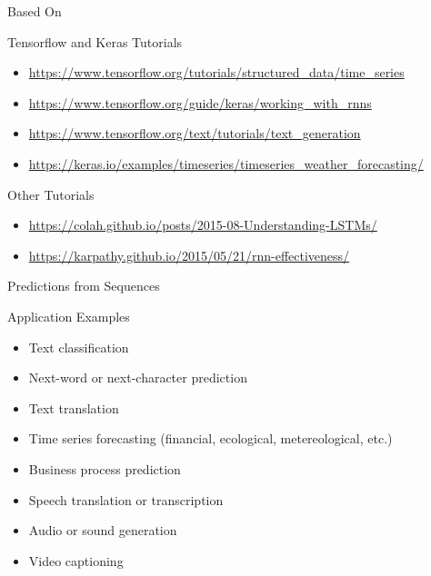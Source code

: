 \documentclass[ignorenonframetext,xcolor=x11names]{beamer}
\begin{document}
\begin{frame}[label=withcode]{Based On}
\begin{block}{Tensorflow and Keras Tutorials}
\begin{itemize}
\item \url{https://www.tensorflow.org/tutorials/structured_data/time_series} \\
\item \url{https://www.tensorflow.org/guide/keras/working_with_rnns} \\
\item \url{https://www.tensorflow.org/text/tutorials/text_generation} \\
\item \url{https://keras.io/examples/timeseries/timeseries_weather_forecasting/} \\
\end{itemize}
\end{block}

\begin{block}{Other Tutorials}
\begin{itemize}
\item \url{https://colah.github.io/posts/2015-08-Understanding-LSTMs/}
\item \url{https://karpathy.github.io/2015/05/21/rnn-effectiveness/}
\end{itemize}
\end{block}
\end{frame}

\begin{frame}[label=full]{Predictions from Sequences}
\begin{block}{Application Examples}
\begin{itemize}
   \item Text classification
   \item Next-word or next-character prediction
   \item Text translation
   \item Time series forecasting (financial, ecological, metereological, etc.)
   \item Business process prediction
   \item Speech translation or transcription
   \item Audio or sound generation
   \item Video captioning
\end{itemize}
\end{block}
\end{frame}
\end{document}
